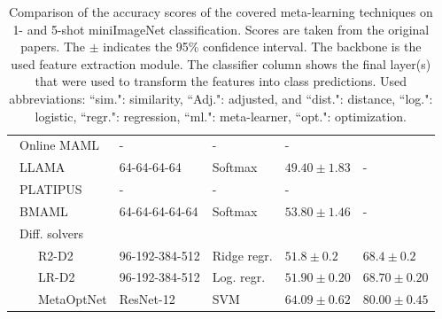 \begin{table}[phtb]
\begin{tabularx}{\linewidth}{lllll}
         \, Online MAML  & - & -& - \\
         \, LLAMA  & 64-64-64-64 & Softmax & $49.40 \pm 1.83$ & -  \\
         \, PLATIPUS & - & -& - \\
         \, BMAML & 64-64-64-64-64 & Softmax & $53.80 \pm 1.46$ & - \\
         \, Diff. solvers  & \\
         \, \, \, \, R2-D2 & 96-192-384-512 & Ridge regr. &$51.8 \pm 0.2$ & $68.4 \pm 0.2$ \\
         \, \, \, \, LR-D2 &  96-192-384-512 & Log. regr. & $51.90 \pm 0.20$ & $68.70 \pm 0.20$ \\
         \, \, \, \, MetaOptNet & ResNet-12 & SVM & {$\boldsymbol{64.09 \pm 0.62}$} & {$\boldsymbol{80.00 \pm 0.45}$} \\
         \bottomrule
    \end{tabularx}
    \caption{Comparison of the accuracy scores of the covered meta-learning techniques on 1- and 5-shot miniImageNet classification. Scores are taken from the original papers. The $\pm$ indicates the 95\% confidence interval. The backbone is the used feature extraction module. The classifier column shows the final layer(s) that were used to transform the features into class predictions. Used abbreviations: ``sim.": similarity, ``Adj.": adjusted, and ``dist.": distance, ``log.": logistic, ``regr.": regression, ``ml.": meta-learner, ``opt.": optimization.}
    \label{tab:performance}
\end{table}

